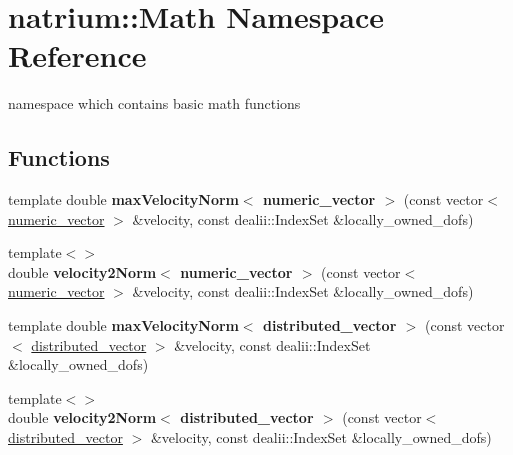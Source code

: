 \hypertarget{namespacenatrium_1_1Math}{
\section{natrium::Math Namespace Reference}
\label{namespacenatrium_1_1Math}
}


namespace which contains basic math functions  
\subsection*{Functions}
\begin{DoxyCompactItemize}
\item 
\hypertarget{namespacenatrium_1_1Math_a679e2186fce3ecd63b28f12abe85d6c8}{
template double {\bfseries maxVelocityNorm$<$ numeric\_\-vector $>$} (const vector$<$ \hyperlink{namespacenatrium_a67c39077adc6634f8fa3762b8eef24c4}{numeric\_\-vector} $>$ \&velocity, const dealii::IndexSet \&locally\_\-owned\_\-dofs)}
\label{namespacenatrium_1_1Math_a679e2186fce3ecd63b28f12abe85d6c8}

\item 
\hypertarget{namespacenatrium_1_1Math_a2e30b25874b35438b936980fded05cea}{
{\footnotesize template$<$$>$ }\\double {\bfseries velocity2Norm$<$ numeric\_\-vector $>$} (const vector$<$ \hyperlink{namespacenatrium_a67c39077adc6634f8fa3762b8eef24c4}{numeric\_\-vector} $>$ \&velocity, const dealii::IndexSet \&locally\_\-owned\_\-dofs)}
\label{namespacenatrium_1_1Math_a2e30b25874b35438b936980fded05cea}

\item 
\hypertarget{namespacenatrium_1_1Math_a5d090f1b2fa0e48d746ec70877178a8f}{
template double {\bfseries maxVelocityNorm$<$ distributed\_\-vector $>$} (const vector$<$ \hyperlink{namespacenatrium_a903d2b92917f582f2ff05f52160ab811}{distributed\_\-vector} $>$ \&velocity, const dealii::IndexSet \&locally\_\-owned\_\-dofs)}
\label{namespacenatrium_1_1Math_a5d090f1b2fa0e48d746ec70877178a8f}

\item 
\hypertarget{namespacenatrium_1_1Math_a2e8a1b8caedd5cd6c1140bdc1f4cf2d5}{
{\footnotesize template$<$$>$ }\\double {\bfseries velocity2Norm$<$ distributed\_\-vector $>$} (const vector$<$ \hyperlink{namespacenatrium_a903d2b92917f582f2ff05f52160ab811}{distributed\_\-vector} $>$ \&velocity, const dealii::IndexSet \&locally\_\-owned\_\-dofs)}
\label{namespacenatrium_1_1Math_a2e8a1b8caedd5cd6c1140bdc1f4cf2d5}


\end{DoxyCompactItemize}

